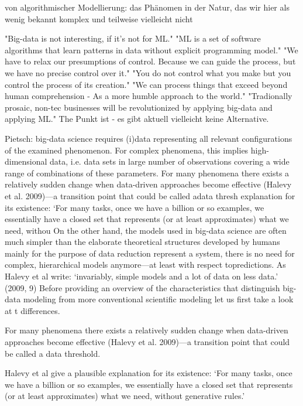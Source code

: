 \documentclass[authoryear,review,3p]{elsarticle}
\begin{document}
von algorithmischer Modellierung: das Phänomen in der Natur, das wir hier als wenig bekannt komplex und teilweise vielleicht nicht



"Big-data is not interesting, if it's not for ML."
"ML is a set of software algorithms that learn patterns in data without explicit programming model."
"We have to relax our presumptions of control. Because we can guide the process, but we have no precise control over it." "You do not control what you make but you control the process of its creation."
"We can process things that exceed beyond human comprehension - As a more humble approach to the world." "Tradionally prosaic, non-tec businesses will be revolutionized by applying big-data and applying ML."
The Punkt ist - es gibt aktuell vielleicht keine Alternative.

Pietsch:
big-data science requires (i)data representing all relevant configurations of the examined phenomenon. For complex phenomena, this implies high-dimensional data, i.e. data sets in large number of observations covering a wide range of combinations of these parameters.
For many phenomena there exists a relatively sudden change when data-driven approaches become effective (Halevy et al. 2009)—a transition point that could be called adata thresh explanation for its existence: ‘For many tasks, once we have a billion or so examples, we essentially have a closed set that represents (or at least approximates) what we need, withou
On the other hand, the models used in big-data science are often much simpler than the elaborate theoretical structures developed by humans mainly for the purpose of data reduction represent a system, there is no need for complex, hierarchical models anymore—at least with respect topredictions. As Halevy et al write: ‘invariably, simple models and a lot of data on less data.’ (2009, 9) Before providing an overview of the characteristics that distinguish big-data modeling from more conventional scientific modeling let us first take a look at t differences.


For many phenomena there exists a relatively sudden change when data-driven approaches become effective (Halevy et al. 2009)—a transition point that could be called a data threshold. 

Halevy et al give a plausible explanation for its existence: ‘For many tasks, once we have a billion or so examples, we essentially have a closed set that represents (or at least approximates) what we need, without generative rules.’
\end{document}
